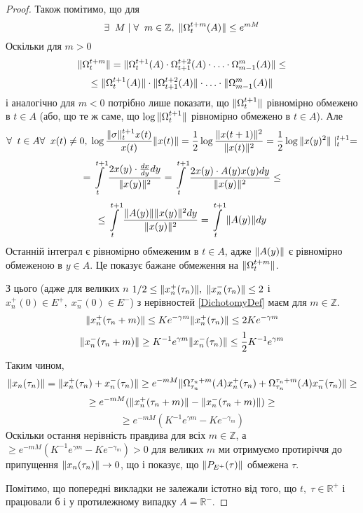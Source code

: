 \documentclass[14pt]{extarticle} %
\let\oldforall\forall
\renewcommand{\forall}{\oldforall\;}
\let\oldexists\exists
\renewcommand{\exists}{\oldexists\;}
\theoremstyle{remark}
\begin{document}
\begin{proof}
	Також помітимо, що для 
	\[\exists M\mid\forall m\in\mathbb{Z},\;\mynorm{\Omega_t^{t+m}(A)}\leq e^{mM}\]
	Оскільки для $m>0$
	\[\|\Omega_t^{t+m}\|=\|\Omega_t^{t+1}(A)\cdot\Omega_{t+1}^{t+2}(A)\cdot\hdots\cdot\Omega_{m-1}^{m}(A)\|\leq\]
	\[\leq \|\Omega_t^{t+1}(A)\|\cdot\|\Omega_{t+1}^{t+2}(A)\|\cdot\hdots\cdot\|\Omega_{m-1}^{m}(A)\|\]
	і аналогічно для $m<0$ потрібно лише показати, що $\|\Omega_t^{t+1}\|$ рівномірно обмежено в $t\in A$ (або,
	що те ж саме, що $\log\|\Omega_t^{t+1}\|$ рівномірно обмежено в $t\in A$). Але
	\[\forall t\in A\forall x(t)\neq 0,\; \log\frac{\mynorm\sigma_t^{t+1}x(t)}{x(t)}{\mynorm{x(t)}}=\frac{1}{2}\log\frac{\mynorm{x(t+1)}^2}
	{\mynorm{x(t)}^2}=\frac{1}{2}\log\mynorm{x(y)^2}\mid_t^{t+1}=\]
	\[=\int_t^{t+1}\frac{2 x(y)\cdot\frac{dx}{dy}dy}{\mynorm{x(y)}^2}=\int_t^{t+1}\frac{2 x(y)\cdot A(y)x(y)dy}{\mynorm{x(y)}^2}\leq\]
	\[\leq\int_t^{t+1}\frac{\mynorm{A(y)}\mynorm{x(y)}^2dy}{\mynorm{x(y)}^2}=\int_t^{t+1}\mynorm{A(y)}dy\]
	Останній інтеграл є рівномірно обмеженим в $t\in A$, адже $\|A(y)\|$ є рівномірно обмеженою в $y\in A$. Це показує бажане обмеження
	на $\|\Omega_t^{t+m}\|$.

	З цього (адже для великих $n$ $1/2\leq\|x_n^+(\tau_n)\|,\;\|x_n^-(\tau_n)\|\leq 2$ і $x_n^+(0)\in E^+,\;x_n^-(0)\in E^-$) 
	з нерівностей \ref{DichotomyDef} маєм
	для $m\in\mathbb{Z}$.
	\[\|x_n^+(\tau_n+m)\|\leq Ke^{-\gamma m}\|x_n^+(\tau_n)\|\leq 2Ke^{-\gamma m}\]
	\[\|x_n^-(\tau_n+m)\|\geq K^{-1}e^{\gamma m}\|x_n^-(\tau_n)\|\leq \frac{1}{2}K^{-1}e^{\gamma m}\]
	Таким чином,
	\[\|x_n(\tau_n)\|=
	\|x_n^+(\tau_n)+x_n^-(\tau_n)\|\geq e^{-mM}\|\Omega^{\tau_n+m}_{\tau_n}(A)x_n^+(\tau_n)+
	\Omega^{\tau_n+m}_{\tau_n}(A)x_n^-(\tau_n)\|\geq\]\[\geq e^{-mM}(\|x_n^+(\tau_n+m)\|-\|x_n^-(\tau_n+m)\|)\geq\]
	\[\geq e^{-mM}(K^{-1}e^{\gamma m}-Ke^{-\gamma_m})\]
	Оскільки остання нерівність правдива для всіх $m\in\mathbb{Z}$, а $\geq e^{-mM}(K^{-1}e^{\gamma m}-Ke^{-\gamma_m})>0$ для великих
	$m$ ми отримуємо протиріччя до припущення $\|x_n(\tau_n)\|\to 0$, що і показує, що $\|P_{E^+}(\tau)\|$ обмежена $\tau$.

	Помітимо, що попередні викладки не залежали істотно від того, що $t,\;\tau\in\mathbb{R}^+$ і працювали б і у протилежному випадку $
	A=\mathbb{R}^-$. 


\end{proof}
\end{document}

